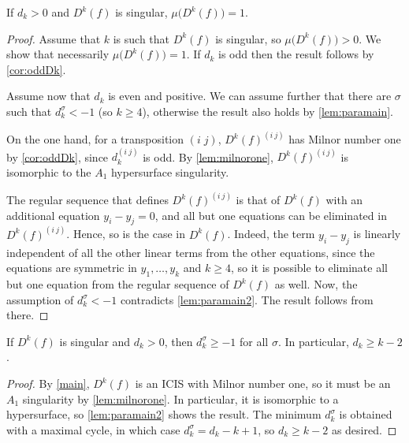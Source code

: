 \documentclass[a4paper,12pt]{amsart}
\begin{document}
\begin{theorem}\label{main}
If $d_k>0$ and $D^k(f)$ is singular, $\mu\big(D^k(f)\big)=1$.
\end{theorem}
\begin{proof}

Assume that $k$ is such that $D^k(f)$ is singular, so $\mu\big(D^k(f)\big)>0$. We show that necessarily $\mu\big(D^k(f)\big)=1$. If $d_k$ is odd then the result follows by \cref{cor:oddDk}.

Assume now that $d_k$ is even and positive. We can assume further that there are $\sigma$ such that $d_k^\sigma<-1$ (so $k\geq4$), otherwise the result also holds by \cref{lem:paramain}.

On the one hand, for a transposition $(i\; j)$, $D^k(f)^{(i\: j)}$ has Milnor number one by \cref{cor:oddDk}, since $d_k^{(i\: j)}$ is odd. By \cref{lem:milnorone}, $D^k(f)^{(i\: j)}$ is isomorphic to the $A_1$ hypersurface singularity.

The regular sequence that defines $D^k(f)^{(i\: j)}$ is that of $D^k(f)$ with an additional equation $y_i-y_j=0$, and all but one equations can be eliminated in $D^k(f)^{(i\: j)}$. Hence, so is the case in $D^k(f)$. Indeed, the term $y_i-y_j$ is linearly independent of all the other linear terms from the other equations, since the equations are symmetric in $y_1,\dots,y_k$ and $k\geq4$, so it is possible to eliminate all but one equation from the regular sequence of $D^k(f)$ as well. Now, the assumption of $d_k^\sigma<-1$ contradicts \cref{lem:paramain2}. The result follows from there.
\end{proof}


\begin{corollary}\label{cor:aftermain}
If $D^k(f)$ is singular and $d_k>0$, then $d_k^\sigma\geq-1$ for all $\sigma$. In particular, $d_k\geq k-2$.
\end{corollary}
\begin{proof}
By \cref{main}, $D^k(f)$ is an ICIS with Milnor number one, so it must be an $A_1$ singularity by \cref{lem:milnorone}. In particular, it is isomorphic to a hypersurface, so \cref{lem:paramain2} shows the result. The minimum $d_k^\sigma$ is obtained with a maximal cycle, in which case $d_k^\sigma=d_k-k+1$, so  $d_k\geq k-2$ as desired.
\end{proof}
\end{document}
